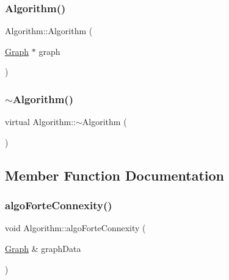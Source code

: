 \mbox{\label{struct_algorithm_a5b56b8a7a5f4ebdd05f9e75862eedd3f}} 
\subsubsection{\texorpdfstring{Algorithm()}{Algorithm()}\hspace{0.1cm}{\footnotesize\ttfamily [2/2]}}
{\footnotesize\ttfamily Algorithm\+::\+Algorithm (\begin{DoxyParamCaption}\item[{\mbox{\hyperlink{class_graph}{Graph}} $\ast$}]{graph }\end{DoxyParamCaption})}

\mbox{\label{struct_algorithm_a6b8fe18068ca11c37d7efc9f4ae0794d}} 
\subsubsection{\texorpdfstring{$\sim$\+Algorithm()}{~Algorithm()}}
{\footnotesize\ttfamily virtual Algorithm\+::$\sim$\+Algorithm (\begin{DoxyParamCaption}{ }\end{DoxyParamCaption})\hspace{0.3cm}{\ttfamily [virtual]}}



\subsection{Member Function Documentation}
\mbox{\label{struct_algorithm_a7c4b5577dd51f39ebff598c5d01fd9d6}} 
\subsubsection{\texorpdfstring{algo\+Forte\+Connexity()}{algoForteConnexity()}}
{\footnotesize\ttfamily void Algorithm\+::algo\+Forte\+Connexity (\begin{DoxyParamCaption}\item[{\mbox{\hyperlink{class_graph}{Graph}} \&}]{graph\+Data }\end{DoxyParamCaption})}

